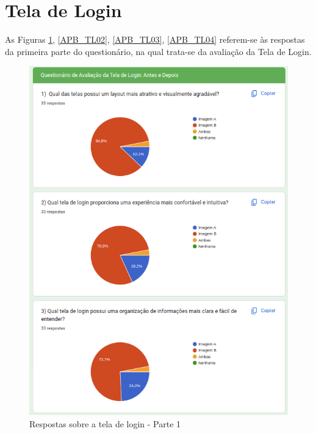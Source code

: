 \newpage

\section{Tela de Login}

As Figuras \ref{APB_TL01}, \ref{APB_TL02}, \ref{APB_TL03}, \ref{APB_TL04} referem-se às respostas da primeira parte do questionário, na qual trata-se da avaliação da Tela de Login.

\begin{figure}[!h]
	\begin{center}
	    \includegraphics[scale=0.7]{figs/Answers/Students/04.png}
	\end{center}
	\caption{\label{APB_TL01}Respostas sobre a tela de login - Parte 1}
\end{figure}

\newpage

